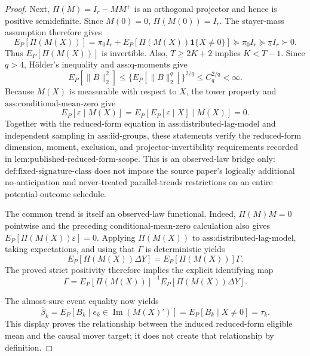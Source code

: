 \documentclass{article}
\begin{document}
\begin{proof}
Next, \(\Pi(M)=I_r-MM^+\) is an orthogonal projector and hence is positive semidefinite. Since \(M(0)=0\), \(\Pi(M(0))=I_r\). The stayer-mass assumption therefore gives
\[
E_P[\Pi(M(X))]
=\pi_0I_r+E_P[\Pi(M(X))\mathbf 1\{X\ne0\}]
\succeq\pi_0I_r
\succeq\underline\pi I_r
\succ0.
\]
Thus \(E_P[\Pi(M(X))]\) is invertible. Also, \(T\ge2K+2\) implies \(K<T-1\). Since \(q>4\), H\"older's inequality and \(\text{ass:q-moments}\) give
\[
E_P[\lVert B\rVert_2^2]
\le \{E_P[\lVert B\rVert_2^q]\}^{2/q}
\le C_q^{2/q}<\infty.
\]
Because \(M(X)\) is measurable with respect to \(X\), the tower property and \(\text{ass:conditional-mean-zero}\) give
\[
E_P[\varepsilon\mid M(X)]
=E_P\!\left[E_P[\varepsilon\mid X]\mid M(X)\right]=0.
\]
Together with the reduced-form equation in \(\text{ass:distributed-lag-model}\) and independent sampling in \(\text{ass:iid-groups}\), these statements verify the reduced-form dimension, moment, exclusion, and projector-invertibility requirements recorded in \(\text{lem:published-reduced-form-scope}\). This is an observed-law bridge only: \(\text{def:fixed-signature-class}\) does not impose the source paper's logically additional no-anticipation and never-treated parallel-trends restrictions on an entire potential-outcome schedule.

The common trend is itself an observed-law functional. Indeed, \(\Pi(M)M=0\) pointwise and the preceding conditional-mean-zero calculation also gives \(E_P[\Pi(M(X))\varepsilon]=0\). Applying \(\Pi(M(X))\) to \(\text{ass:distributed-lag-model}\), taking expectations, and using that \(\Gamma\) is deterministic yields
\[
E_P[\Pi(M(X))\Delta Y]
=E_P[\Pi(M(X))]\Gamma.
\]
The proved strict positivity therefore implies the explicit identifying map
\[
\Gamma
=E_P[\Pi(M(X))]^{-1}E_P[\Pi(M(X))\Delta Y].
\]

The almost-sure event equality now yields
\[
\overline\beta_k
=E_P[B_k\mid e_k\in\operatorname{Im}(M(X)')]
=E_P[B_k\mid X\ne0]
=\tau_k.
\]
This display proves the relationship between the induced reduced-form eligible mean and the causal mover target; it does not create that relationship by definition.


\end{proof}
\end{document}
